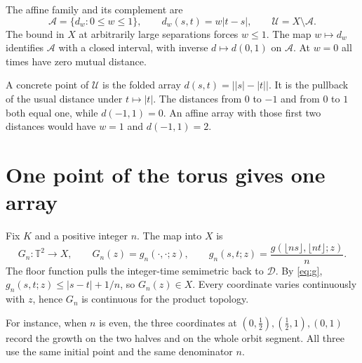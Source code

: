 \documentclass[11pt,a4paper]{article}
\newcommand{\T}{\mathbb{T}}
\newcommand{\D}{\mathcal{D}}
\newcommand{\A}{\mathcal{A}}
\newcommand{\U}{\mathcal{U}}
\begin{document}
The affine family and its complement are
\begin{equation}\label{eq:affine}
 \A=\{d_w:0\le w\le1\},\qquad d_w(s,t)=w|t-s|,\qquad \U=X\setminus\A .
\end{equation}
The bound in $X$ at arbitrarily large separations forces $w\le1$. The map
$w\mapsto d_w$ identifies $\A$ with a closed interval, with inverse $d\mapsto d(0,1)$
on $\A$. At $w=0$ all times have zero mutual distance.

A concrete point of $\U$ is the folded array $d(s,t)=\bigl||s|-|t|\bigr|$.
It is the pullback of the usual distance under $t\mapsto|t|$. The distances
from $0$ to $-1$ and from $0$ to $1$ both equal one, while $d(-1,1)=0$.
An affine array with those first two distances would have $w=1$ and $d(-1,1)=2$.

\newpage
\section{One point of the torus gives one array}
Fix $K$ and a positive integer $n$. The map into $X$ is
\begin{equation}\label{eq:array}
 G_n:\T^2\longrightarrow X,\qquad G_n(z)=g_n(\cdot,\cdot;z),\qquad
 g_n(s,t;z)=\frac{g(\lfloor ns\rfloor,\lfloor nt\rfloor;z)}{n}.
\end{equation}
The floor function pulls the integer-time semimetric back to $\D$. By \eqref{eq:g},
$g_n(s,t;z)\le |s-t|+1/n$, so $G_n(z)\in X$. Every coordinate varies continuously
with $z$, hence $G_n$ is continuous for the product topology.

For instance, when $n$ is even, the three coordinates at
$(0,\tfrac12),(\tfrac12,1),(0,1)$ record the growth on the two halves and on the
whole orbit segment. All three use the same initial point and the same denominator $n$.
\end{document}
